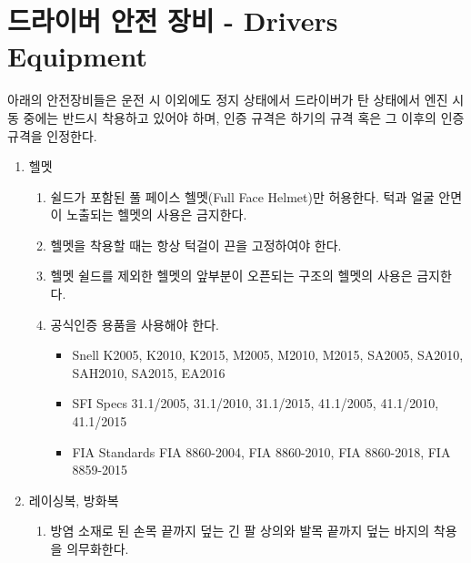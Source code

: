 \documentclass[final,a4paper,10pt]{report}
\begin{document}
\section{드라이버 안전 장비 - Drivers Equipment}\label{rule:formula-technical.driver-equipment} \label{section:드라이버 안전 장비}
아래의 안전장비들은 운전 시 이외에도 정지 상태에서 드라이버가 탄 상태에서 엔진 시동 중에는 반드시 착용하고 있어야 하며, 인증 규격은 하기의 규격 혹은 그 이후의 인증 규격을 인정한다.
\begin{enumerate}
  \item\label{rule:formula-technical.driver-equipment.helmet} 헬멧
    \begin{enumerate}
      \item\label{rule:formula-technical.driver-equipment.helmet.full-face-shield-only} 쉴드가 포함된 풀 페이스 헬멧(Full Face Helmet)만 허용한다. 턱과 얼굴 안면이 노출되는 헬멧의 사용은 금지한다.
      \item\label{rule:formula-technical.driver-equipment.helmet.chin-strap-fastened} 헬멧을 착용할 때는 항상 턱걸이 끈을 고정하여야 한다.
      \item\label{rule:formula-technical.driver-equipment.helmet.no-open-front-structure} 헬멧 쉴드를 제외한 헬멧의 앞부분이 오픈되는 구조의 헬멧의 사용은 금지한다.

      \item\label{rule:formula-technical.driver-equipment.helmet.accepted-certification-standards} 공식인증 용품을 사용해야 한다.
        \begin{itemize}
          \item Snell K2005, K2010, K2015, M2005, M2010, M2015, SA2005, SA2010, SAH2010, SA2015, EA2016
          \item SFI Specs 31.1/2005, 31.1/2010, 31.1/2015, 41.1/2005, 41.1/2010, 41.1/2015
          \item FIA Standards FIA 8860-2004, FIA 8860-2010, FIA 8860-2018, FIA 8859-2015
        \end{itemize}

    \end{enumerate}

  \item\label{rule:formula-technical.driver-equipment.driving-suit} 레이싱복, 방화복
    \begin{enumerate}
      \item\label{rule:formula-technical.driver-equipment.driving-suit.flame-resistant-full-coverage} 방염 소재로 된 손목 끝까지 덮는 긴 팔 상의와 발목 끝까지 덮는 바지의 착용을 의무화한다.


\end{enumerate}
\end{enumerate}
\end{document}

